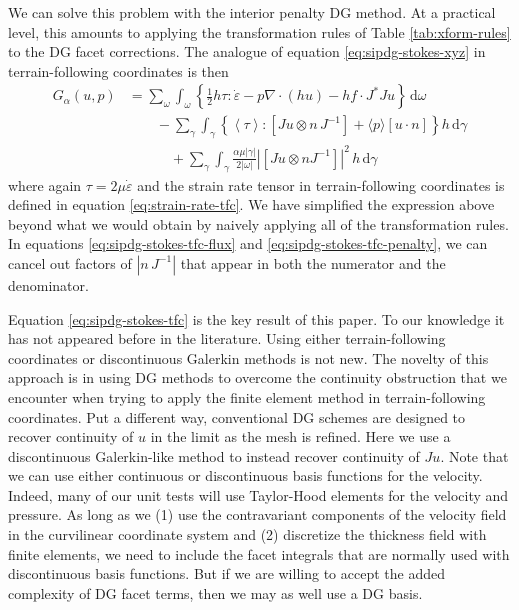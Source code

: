 \documentclass[gmd, manuscript]{copernicus}
\begin{document}
We can solve this problem with the interior penalty DG method.
At a practical level, this amounts to applying the transformation rules of Table \ref{tab:xform-rules} to the DG facet corrections.
The analogue of equation \eqref{eq:sipdg-stokes-xyz} in terrain-following coordinates is then
\begin{subequations}
    \label{eq:sipdg-stokes-tfc}
    \begin{align}
        G_\alpha(u, p) & = \sum_\omega\int_\omega\left\{\frac{1}{2}h\tau:\dot\varepsilon - p\nabla\cdot(h u) - hf\cdot J^*Ju\right\}\,\mathrm{d}\omega \\
        & \qquad - \sum_\gamma\int_\gamma\left\{\left\langle \tau\right\rangle:[Ju\otimes n\,J^{-1}] + \langle p\rangle[u\cdot n] \right\}h\,\mathrm{d}\gamma \label{eq:sipdg-stokes-tfc-flux} \\
        & \quad\qquad + \sum_\gamma\int_\gamma\frac{\alpha\mu|\gamma|}{2|\omega|}|[Ju\otimes nJ^{-1}]|^2\,h\,\mathrm{d}\gamma \label{eq:sipdg-stokes-tfc-penalty}
    \end{align}
\end{subequations}
where again $\tau = 2\mu\dot\varepsilon$ and the strain rate tensor in terrain-following coordinates is defined in equation \eqref{eq:strain-rate-tfc}.
We have simplified the expression above beyond what we would obtain by naively applying all of the transformation rules.
In equations \eqref{eq:sipdg-stokes-tfc-flux} and \eqref{eq:sipdg-stokes-tfc-penalty}, we can cancel out factors of $|n\,J^{-1}|$ that appear in both the numerator and the denominator.

Equation \eqref{eq:sipdg-stokes-tfc} is the key result of this paper.
To our knowledge it has not appeared before in the literature.
Using either terrain-following coordinates or discontinuous Galerkin methods is not new.
The novelty of this approach is in using DG methods to overcome the continuity obstruction that we encounter when trying to apply the finite element method in terrain-following coordinates.
Put a different way, conventional DG schemes are designed to recover continuity of $u$ in the limit as the mesh is refined.
Here we use a discontinuous Galerkin-like method to instead recover continuity of $Ju$.
Note that we can use either continuous or discontinuous basis functions for the velocity.
Indeed, many of our unit tests will use Taylor-Hood elements for the velocity and pressure.
As long as we (1) use the contravariant components of the velocity field in the curvilinear coordinate system and (2) discretize the thickness field with finite elements, we need to include the facet integrals that are normally used with discontinuous basis functions.
But if we are willing to accept the added complexity of DG facet terms, then we may as well use a DG basis.
\end{document}
